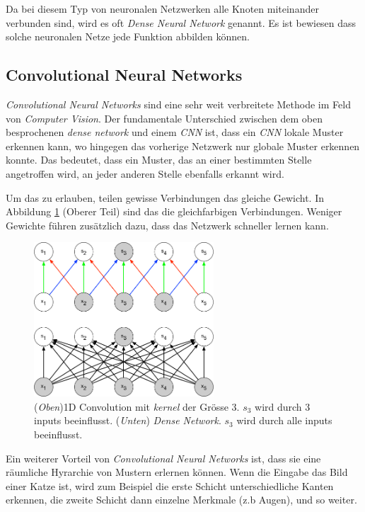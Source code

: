 Da bei diesem Typ von neuronalen Netzwerken alle Knoten miteinander verbunden sind, wird es oft \textit{Dense Neural Network} genannt.
Es ist bewiesen dass solche neuronalen Netze jede Funktion abbilden können\parencite[][Kap. 4]{universal}.


\subsection{Convolutional Neural Networks}
\textit{Convolutional Neural Networks} sind eine sehr weit verbreitete Methode im Feld von \textit{Computer Vision}. Der fundamentale Unterschied zwischen dem oben besprochenen \textit{dense network} und einem \textit{CNN} ist, dass ein \textit{CNN} lokale Muster erkennen kann, wo hingegen das vorherige Netzwerk nur globale Muster erkennen konnte. Das bedeutet, dass ein Muster, das an einer bestimmten Stelle angetroffen wird, an jeder anderen Stelle ebenfalls erkannt wird. \parencite{chollet}

Um das zu erlauben, teilen gewisse Verbindungen das gleiche Gewicht. In Abbildung \ref{img:conv} (Oberer Teil) sind das die gleichfarbigen Verbindungen. Weniger Gewichte führen zusätzlich dazu, dass das Netzwerk schneller lernen kann.
\begin{figure}[hbt]
	\centering
		\includegraphics[width=0.6\textwidth]{assets/conv_1d.png}
	\caption{(\textit{Oben})1D Convolution mit \textit{kernel} der Grösse 3. $s_3$ wird durch 3 inputs beeinflusst.
		     (\textit{Unten}) \textit{Dense Network}. $s_3$ wird durch alle inputs beeinflusst.\parencite{goodfellow}}
	\label{img:conv}
\end{figure}

Ein weiterer Vorteil von \textit{Convolutional Neural Networks} ist, dass sie eine räumliche Hyrarchie von Mustern erlernen können. Wenn die Eingabe das Bild einer Katze ist, wird zum Beispiel die erste Schicht unterschiedliche Kanten erkennen, die zweite Schicht dann einzelne Merkmale (z.b Augen), und so weiter.

